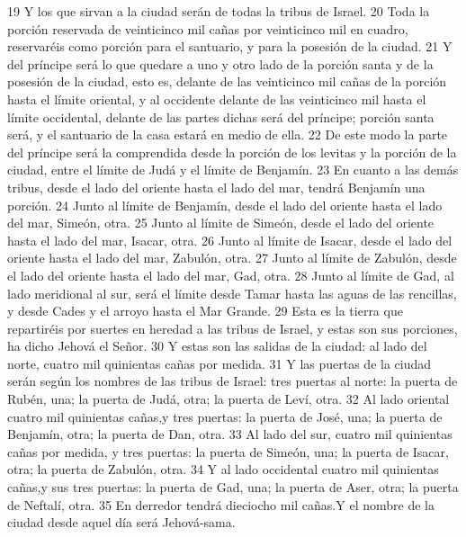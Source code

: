 19 Y los que sirvan a la ciudad serán de todas la tribus de Israel.
20 Toda la porción reservada de veinticinco mil cañas por veinticinco mil en cuadro, reservaréis como porción para el santuario, y para la posesión de la ciudad.
21 Y del príncipe será lo que quedare a uno y otro lado de la porción santa y de la posesión de la ciudad, esto es, delante de las veinticinco mil cañas de la porción hasta el límite oriental, y al occidente delante de las veinticinco mil hasta el límite occidental, delante de las partes dichas será del príncipe; porción santa será, y el santuario de la casa estará en medio de ella.
22 De este modo la parte del príncipe será la comprendida desde la porción de los levitas y la porción de la ciudad, entre el límite de Judá y el límite de Benjamín.
23 En cuanto a las demás tribus, desde el lado del oriente hasta el lado del mar, tendrá Benjamín una porción.
24 Junto al límite de Benjamín, desde el lado del oriente hasta el lado del mar, Simeón, otra.
25 Junto al límite de Simeón, desde el lado del oriente hasta el lado del mar, Isacar, otra.
26 Junto al límite de Isacar, desde el lado del oriente hasta el lado del mar, Zabulón, otra.
27 Junto al límite de Zabulón, desde el lado del oriente hasta el lado del mar, Gad, otra.
28 Junto al límite de Gad, al lado meridional al sur, será el límite desde Tamar hasta las aguas de las rencillas, y desde Cades y el arroyo hasta el Mar Grande.
29 Esta es la tierra que repartiréis por suertes en heredad a las tribus de Israel, y estas son sus porciones, ha dicho Jehová el Señor.
30 Y estas son las salidas de la ciudad: al lado del norte, cuatro mil quinientas cañas por medida.
31 Y las puertas de la ciudad serán según los nombres de las tribus de Israel: tres puertas al norte: la puerta de Rubén, una; la puerta de Judá, otra; la puerta de Leví, otra.
32 Al lado oriental cuatro mil quinientas cañas,y tres puertas: la puerta de José, una; la puerta de Benjamín, otra; la puerta de Dan, otra.
33 Al lado del sur, cuatro mil quinientas cañas por medida, y tres puertas: la puerta de Simeón, una; la puerta de Isacar, otra; la puerta de Zabulón, otra.
34 Y al lado occidental cuatro mil quinientas cañas,y sus tres puertas: la puerta de Gad, una; la puerta de Aser, otra; la puerta de Neftalí, otra.
35 En derredor tendrá dieciocho mil cañas.Y el nombre de la ciudad desde aquel día será Jehová-sama.


